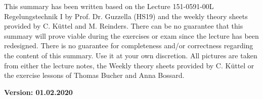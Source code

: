 



\maketitle
\begin{center}
This summary has been written based on the Lecture 151-0591-00L Regelungstechnik I by Prof. Dr. Guzzella (HS19) and the weekly theory sheets provided by C. Küttel and M. Reinders. There can be no guarantee that this summary will prove viable during the exercises or exam since the lecture has been redesigned. There is no guarantee for completeness and/or correctness regarding the content of this summary. Use it at your own discretion. All pictures are taken from either the lecture notes, the Weekly theory sheets provided by C. Küttel or the exercise lessons of Thomas Bucher and Anna Bossard.

\textbf{Version: 01.02.2020}
\end{center}
\newpage

\maketitle
\begin{center}
\begin{multicols*}{3}
\tableofcontents
\end{multicols*}
\end{center}
\begin{multicols*}{3}











\end{multicols*}



